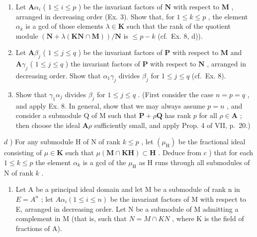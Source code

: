 \begin{enumerate}
\def\labelenumi{\alph{enumi})}
\item
  Let \(\mathbf{A}\alpha_{i}\) ( \(1 \leqslant i \leqslant p\) ) be the invariant factors of \(\mathbf{N}\) with respect to \(\mathbf{M}\) , arranged in decreasing order (Ex. 3). Show that, for \(1 \leqslant k \leqslant p\) , the element \(\alpha_{k}\) is a gcd of those elements \(\lambda \in \mathbf{K}\) such that the rank of the quotient module \((\mathbf{N} + \lambda (\mathbf{KN} \cap \mathbf{M})) / \mathbf{N}\) is \(\leqslant p - k\) (cf.~Ex. 8, d)).
\item
  Let \(\mathbf{A}\beta_{j}\) ( \(1 \leqslant j \leqslant q\) ) be the invariant factors of \(\mathbf{P}\) with respect to \(\mathbf{M}\) and \(\mathbf{A}\gamma_{j}\) ( \(1 \leqslant j \leqslant q\) ) the invariant factors of \(\mathbf{P}\) with respect to \(\mathbf{N}\) , arranged in decreasing order. Show that \(\alpha_{1}\gamma_{j}\) divides \(\beta_{j}\) for \(1 \leqslant j \leqslant q\) (cf.~Ex. 8).
\item
  Show that \(\gamma_{1}\alpha_{j}\) divides \(\beta_{j}\) for \(1 \leqslant j \leqslant q\) . (First consider the case \(n = p = q\) , and apply Ex. 8. In general, show that we may always assume \(p = n\) , and consider a submodule Q of M such that \(\mathbf{P} + \rho \mathbf{Q}\) has rank \(p\) for all \(\rho \in \mathbf{A}\) ; then choose the ideal \(\mathbf{A}\rho\) sufficiently small, and apply Prop. 4 of VII, p.~20.)
\end{enumerate}

\(d\) ) For any submodule H of N of rank \(k \leqslant p\) , let \((\mu_{\mathrm{H}})\) be the fractional ideal consisting of \(\mu \in \mathbf{K}\) such that \(\mu (\mathbf{M} \cap \mathbf{KH}) \subset \mathbf{H}\) . Deduce from \(c\) ) that for each \(1 \leqslant k \leqslant p\) the element \(\alpha_{k}\) is a gcd of the \(\mu_{\mathrm{H}}\) as H runs through all submodules of N of rank \(k\) .

\begin{enumerate}
\def\labelenumi{\arabic{enumi})}
\setcounter{enumi}{9}
\tightlist
\item
  Let A be a principal ideal domain and let M be a submodule of rank n in \(E = A^{n}\) ; let \(A\alpha_{i} (1 \leqslant i \leqslant n)\) be the invariant factors of M with respect to E, arranged in decreasing order. Let N be a submodule of M admitting a complement in M (that is, such that \(N = M \cap KN\) , where K is the field of fractions of A).
\end{enumerate}

